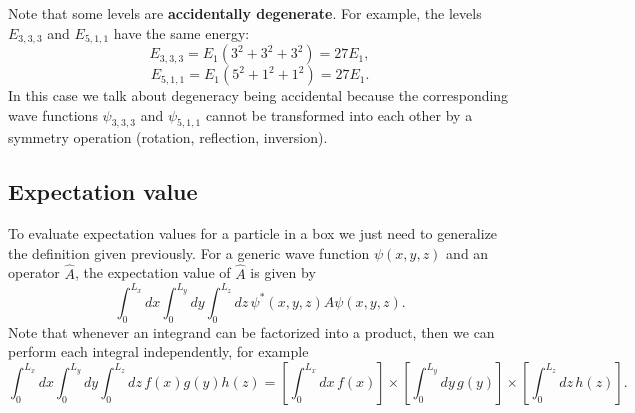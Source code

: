 \documentclass[../Main/chem331-notes.tex]{subfiles}
\begin{document}
Note that some levels are \textbf{accidentally degenerate}.
For example, the levels $E_{3,3,3}$ and $E_{5,1,1}$ have the same energy:
\begin{equation}
E_{3,3,3} =  E_1 (3^2 + 3^2 + 3^2) = 27 E_1,
\end{equation}
\begin{equation}
E_{5,1,1} =  E_1 (5^2 + 1^2 + 1^2) = 27 E_1.
\end{equation}
In this case we talk about degeneracy being accidental because the corresponding wave functions $\psi_{3,3,3}$ and $\psi_{5,1,1}$ cannot be transformed into each other by a symmetry operation (rotation, reflection, inversion).

\subsection{Expectation value}
To evaluate expectation values for a particle in a box we just need to generalize the definition given previously.
For a generic wave function $\psi(x,y,z)$ and an operator $\hat{A}$, the expectation value of $\hat{A}$ is given by
\begin{equation}
\int_0^{L_x} dx \int_0^{L_y} dy \int_0^{L_z} dz \, \psi^*(x,y,z) \hat{A} \psi(x,y,z).
\end{equation}
Note that whenever an integrand can be factorized into a product, then we can perform each integral independently, for example
\begin{equation}
\int_0^{L_x} dx \int_0^{L_y} dy \int_0^{L_z} dz \, f(x) g(y) h(z)
= \left[ \int_0^{L_x} dx \, f(x)\right] \times \left[ \int_0^{L_y} dy \, g(y) \right] \times \left[  \int_0^{L_z} dz \, h(z) \right].
\end{equation}
\end{document}

